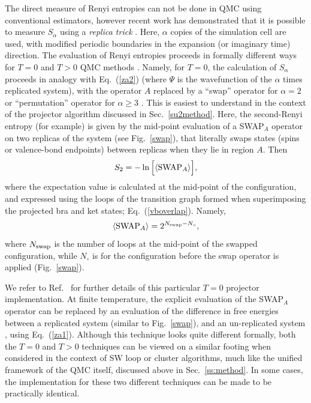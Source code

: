 \documentclass[range]{ar2e}
\begin{document}
The direct measure of Renyi entropies can not be done in QMC using conventional estimators, however recent work has demonstrated that it is possible to 
measure $S_{\alpha}$ using a {\it replica trick} \cite{Holz,Cardy, Fradkin, BP, Naka}.  Here, $\alpha$ copies of the simulation cell are used, with modified 
periodic boundaries in the expansion (or imaginary time) direction.  The evaluation of Renyi entropies proceeds in formally different ways for $T=0$ and $T>0$ 
QMC methods \cite{Hastings10,Melko10}.  Namely, for $T=0$, the calculation of $S_{\alpha}$ proceeds in analogy with Eq.~(\ref{za2}) (where $\Psi$ is the wavefunction 
of the $\alpha$ times replicated system), with the operator $A$ replaced by a ``swap'' operator for $\alpha=2$ \cite{Hastings10} or ``permutation'' 
operator for $\alpha \ge 3$ \cite{Kallin11}. This is easiest to 
understand in the context of the projector algorithm discussed in Sec.~\ref{su2method}.  Here, the second-Renyi entropy (for example) is given by the
 mid-point evaluation of a SWAP$_A$ operator
on two replicas of the system (see Fig.~\ref{swap}), that literally swaps states 
(spins or valence-bond endpoints) between replicas when they lie in region $A$.  Then
\begin{equation}
 S_2 = -\ln \Big[ \langle {\rm SWAP}_A \rangle \Big],
\end{equation}
where the expectation value is calculated at the mid-point of the configuration, and expressed using the loops of the transition graph formed when 
superimposing the projected bra and ket states; Eq.~(\ref{vboverlap}).  Namely,
\begin{equation}
\langle {\rm SWAP}_A \rangle = 2^{N_{\rm swap} - N_\circ } ,
\end{equation} 
where $N_{\rm swap}$ is the number of loops at the mid-point of the swapped configuration, while $N_\circ$ is for the configuration before the swap operator 
is applied (Fig.~\ref{swap}).  

We refer to Ref.~\cite{Kallin11} for further details of this particular $T=0$ projector implementation.  At finite temperature, the explicit evaluation 
of the SWAP$_A$ operator can be replaced by an evaluation of the difference in free energies between a replicated system (similar to Fig.~\ref{swap}), 
and an un-replicated system \cite{Melko10}, using Eq.~(\ref{za1}).  Although this technique looks quite different formally, both the $T=0$ and $T>0$ techniques 
can be viewed on a similar footing when considered in the context of SW loop or cluster algorithms, much like the unified framework of the QMC itself, discussed
above in Sec.~\ref{ss:method}. In some cases, the implementation for these two different techniques can be made to be practically identical.  
\end{document}
